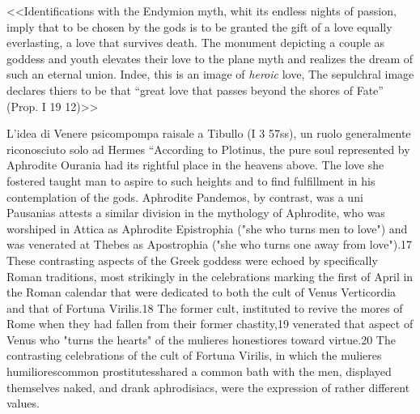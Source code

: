 \documentclass[12pt,a4paper,openright, oneside]{book}
\begin{document}
<<Identifications with the Endymion myth, whit its endless nights of passion, imply that to be chosen by the gods is to be granted the gift of a love equally everlasting, a love that survives death. The monument depicting a couple as goddess and youth elevates their love to the plane myth and realizes the dream of such an eternal union. Indee, this is an image of \textit{heroic} love, The sepulchral image declares thiers to be that ``great love that passes beyond the shores of Fate'' (Prop. I 19 12)>>

L'idea di Venere psicompompa raisale a Tibullo (I 3 57ss), un ruolo generalmente riconosciuto solo ad Hermes
“According to Plotinus, the pure soul represented by Aphrodite Ourania had its rightful place in the heavens above. The love she fostered taught man to aspire to such heights and to find fulfillment in his contemplation of the gods. Aphrodite Pandemos, by contrast, was a uni Pausanias attests a similar division in the mythology of Aphrodite, who was worshiped in Attica as Aphrodite Epistrophia ("she who turns men to love") and was venerated at Thebes as Apostrophia ("she who turns one away from love").17 These contrasting aspects of the Greek goddess were echoed by specifically Roman traditions, most strikingly in the celebrations marking the first of April in the Roman calendar that were dedicated to both the cult of Venus Verticordia and that of Fortuna Virilis.18 The former cult, instituted to revive the mores of Rome when they had fallen from their former chastity,19 venerated that aspect of Venus who "turns the hearts" of the mulieres honestiores toward virtue.20 The contrasting celebrations of the cult of Fortuna Virilis, in which the mulieres humiliorescommon prostitutesshared a common bath with the men, displayed themselves naked, and drank aphrodisiacs, were the expression of rather different values.
\end{document}
